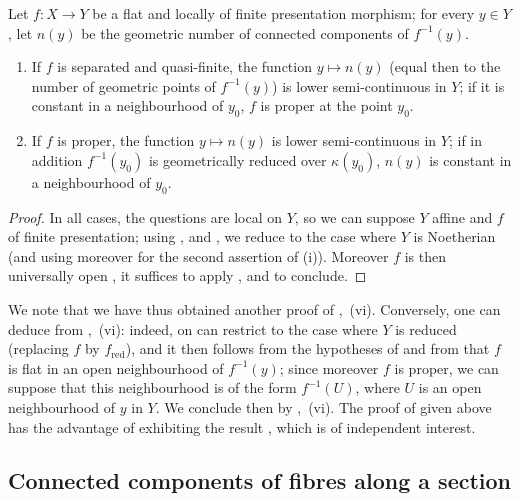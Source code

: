 
\begin{proposition}[15.5.9]
\label{IV.15.5.9}
Let $f:X\to Y$ be a flat and locally of finite presentation morphism; for every $y\in Y$, let $n(y)$ be the geometric number of connected components of $f^{-1}(y)$.
\begin{enumerate}[label=(\roman*)]
  \item If $f$ is separated and quasi-finite, the function $y\mapsto n(y)$ (equal then to the number of geometric points of $f^{-1}(y)$) is lower semi-continuous in $Y$; if it is constant in a neighbourhood of $y_0$, $f$ is proper at the point $y_0$.
  \item If $f$ is proper, the function $y\mapsto n(y)$ is lower semi-continuous in $Y$; if in addition $f^{-1}(y_0)$ is geometrically reduced over $\kappa(y_0)$, $n(y)$ is constant in a neighbourhood of $y_0$.
\end{enumerate}
\end{proposition}

\begin{proof}
In all cases, the questions are local on $Y$, so we can suppose $Y$ affine and $f$ of finite presentation; using ,  and , we reduce to the case where $Y$ is Noetherian (and using moreover  for the second assertion of (i)).
Moreover $f$ is then universally open , it suffices to apply ,  and  to conclude.
\end{proof}

\begin{remarks}[15.5.10]
\label{IV.15.5.10}
We note that we have thus obtained another proof of ,~(vi).
Conversely, one can deduce  from ,~(vi): indeed, on can restrict to the case where $Y$ is reduced (replacing $f$ by $f_\mathrm{red}$), and it then follows from the hypotheses of  and from  that $f$ is flat in an open neighbourhood of $f^{-1}(y)$; since moreover $f$ is proper, we can suppose that this neighbourhood is of the form $f^{-1}(U)$, where $U$ is an open neighbourhood of $y$ in $Y$.
We conclude then by ,~(vi).
The proof of  given above has the advantage of exhibiting the result , which is of independent interest.
\end{remarks}


\subsection{Connected components of fibres along a section}
\label{subsection:IV.15.6}

